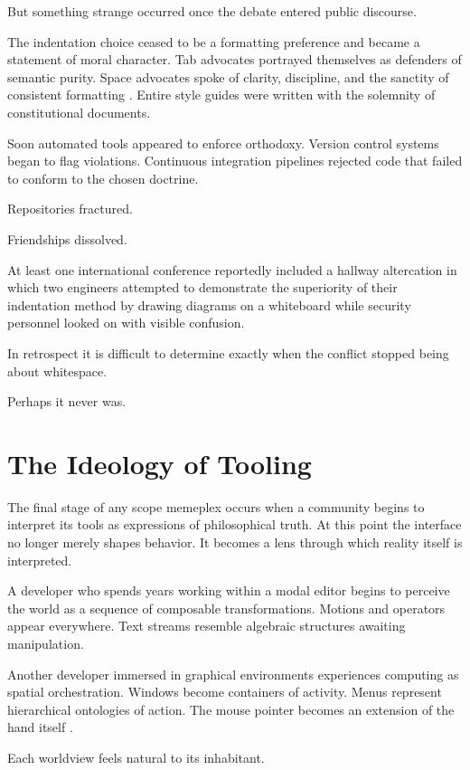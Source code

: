 \documentclass[11pt]{article}
\theoremstyle{definition}
\begin{document}
But something strange occurred once the debate entered public discourse.

The indentation choice ceased to be a formatting preference and became
a statement of moral character. Tab advocates portrayed themselves as
defenders of semantic purity. Space advocates spoke of clarity,
discipline, and the sanctity of consistent formatting \cite{knuth1984}.
Entire style guides were written with the solemnity of constitutional
documents.

Soon automated tools appeared to enforce orthodoxy. Version control
systems began to flag violations. Continuous integration pipelines
rejected code that failed to conform to the chosen doctrine.

Repositories fractured.

Friendships dissolved.

At least one international conference reportedly included a hallway
altercation in which two engineers attempted to demonstrate the
superiority of their indentation method by drawing diagrams on a
whiteboard while security personnel looked on with visible confusion.

In retrospect it is difficult to determine exactly when the conflict
stopped being about whitespace.

Perhaps it never was.

\section{The Ideology of Tooling}

The final stage of any scope memeplex occurs when a community begins to
interpret its tools as expressions of philosophical truth. At this point
the interface no longer merely shapes behavior. It becomes a lens through
which reality itself is interpreted.

A developer who spends years working within a modal editor begins to
perceive the world as a sequence of composable transformations. Motions
and operators appear everywhere. Text streams resemble algebraic
structures awaiting manipulation.

Another developer immersed in graphical environments experiences
computing as spatial orchestration. Windows become containers of
activity. Menus represent hierarchical ontologies of action. The mouse
pointer becomes an extension of the hand itself \cite{norman1988}.

Each worldview feels natural to its inhabitant.
\end{document}
